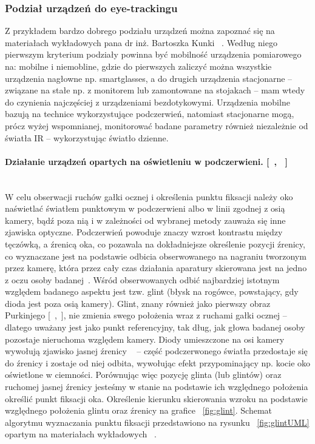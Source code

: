 \documentclass[twoside,a4paper]{book}
\begin{document}
\subsubsection{Podział urządzeń do eye-trackingu}

Z przykładem bardzo dobrego podziału urządzeń można zapoznać się na materiałach wykładowych pana dr inż. Bartoszka Kunki ~\cite{kunkaFiksacja}. Według niego pierwszym kryterium podziały powinna być mobilność urządzenia pomiarowego na: mobilne i niemobline, gdzie do pierwszych zaliczyć można wszystkie urządzenia nagłowne np. smartglasses, a do drugich urządzenia stacjonarne – związane na stałe np. z monitorem lub zamontowane na stojakach – mam wtedy do czynienia najczęściej z urządzeniami bezdotykowymi. Urządzenia mobilne bazują na technice wykorzystujące podczerwień, natomiast stacjonarne mogą, prócz wyżej wspomnianej, monitorować badane parametry również niezależnie od światła  IR – wykorzystując światło dzienne. 

\paragraph{Działanie urządzeń opartych na oświetleniu w podczerwieni. [~\cite{kunkaFiksacja}, ~\cite{erica}]}\leavevmode\\
W celu obserwacji ruchów gałki ocznej i określenia punktu fiksacji należy oko naświetlać światłem punktowym w podczerwieni albo w linii zgodnej z osią kamery, bądź poza nią i w zależności od wybranej metody zauważa się inne zjawiska optyczne. Podczerwień powoduje znaczy wzrost kontrastu między tęczówką, a źrenicą oka, co pozawala na dokładniejsze określenie pozycji źrenicy, co wyznaczane jest na podstawie odbicia obserwowanego na nagraniu tworzonym przez kamerę, która przez cały czas działania aparatury  skierowana jest na jedno z oczu osoby badanej~\cite{erica}.
Wśród obserwowanych odbić najbardziej istotnym względem badanego aspektu jest tzw. glint (błysk na rogówce, powstający, gdy dioda jest poza osią kamery). Glint, znany również jako  pierwszy obraz Purkinjego [~\cite{kunkaFiksacja},~\cite{erica}], nie zmienia swego położenia wraz z ruchami gałki ocznej – dlatego uważany jest jako punkt referencyjny, tak dług, jak głowa badanej osoby pozostaje nieruchoma względem kamery.  Diody umieszczone na osi kamery wywołują zjawisko jasnej źrenicy ~\cite{kunkaFiksacja} – część podczerwonego światła przedostaje się do źrenicy i zostaje od niej odbita, wywołując efekt  przypominający np. kocie oko oświetlone w ciemności.  Porównując więc pozycję glinta (lub glintów) oraz ruchomej jasnej źrenicy jesteśmy w stanie na podstawie ich względnego położenia określić punkt fiksacji oka. Określenie kierunku skierowania wzroku na podstawie względnego położenia glintu oraz źrenicy na grafice  ~\ref{fig:glint}. Schemat algorytmu wyznaczania punktu fiksacji przedstawiono na rysunku ~\ref{fig:glintUML} opartym na materiałach wykładowych ~\cite{kunkaFiksacja}.
\end{document}
